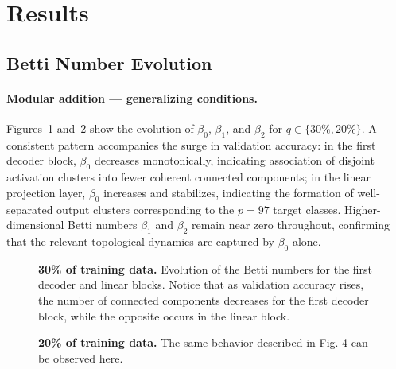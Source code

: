 \section{Results}
\label{sec:results}

\subsection{Betti Number Evolution}
\label{subsec:results_betti}

\paragraph{Modular addition — generalizing conditions.}
Figures~\ref{fig:sum-decoder0-linear-30pct} and~\ref{fig:sum-decoder0-linear-20pct} show the evolution of $\beta_0$, $\beta_1$, and $\beta_2$ for $q \in \{30\%, 20\%\}$. A consistent pattern accompanies the surge in validation accuracy: in the first decoder block, $\beta_0$ decreases monotonically, indicating association of disjoint activation clusters into fewer coherent connected components; in the linear projection layer, $\beta_0$ increases and stabilizes, indicating the formation of well-separated output clusters corresponding to the $p = 97$ target classes. Higher-dimensional Betti numbers $\beta_1$ and $\beta_2$ remain near zero throughout, %
confirming that the relevant topological dynamics are captured by $\beta_0$ alone.

\begin{figure}
	\centering
	
	
	\caption[30\% of training data.]{\textbf{30\% of training data.} Evolution of the Betti numbers for the first decoder and linear blocks. Notice that as validation accuracy rises, the number of connected components decreases for the first decoder block, while the opposite occurs in the linear block.}
	\label{fig:sum-decoder0-linear-30pct}
\end{figure}

\begin{figure}
	\centering
	
	
	\caption[20\% of training data.]{\textbf{20\% of training data.} The same behavior described in \hyperref[fig:sum-decoder0-linear-30pct]{Fig. 4} can be observed here.}
	\label{fig:sum-decoder0-linear-20pct}
\end{figure}

